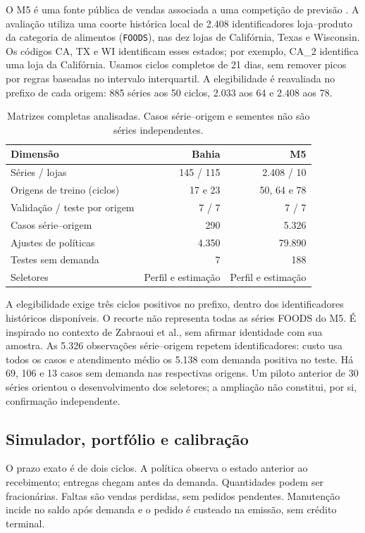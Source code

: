 \documentclass[preprint,12pt]{elsarticle}
\begin{document}
O M5 é uma fonte pública de vendas associada a uma competição de previsão \cite{Makridakis2022M5Accuracy}. A avaliação utiliza uma coorte histórica local de 2.408 identificadores loja--produto da categoria de alimentos (\texttt{FOODS}), nas dez lojas de Califórnia, Texas e Wisconsin. Os códigos CA, TX e WI identificam esses estados; por exemplo, CA\_2 identifica uma loja da Califórnia. Usamos ciclos completos de 21 dias, sem remover picos por regras baseadas no intervalo interquartil. A elegibilidade é reavaliada no prefixo de cada origem: 885 séries aos 50 ciclos, 2.033 aos 64 e 2.408 aos 78.

\begin{table}[htbp]\centering\small
\caption{Matrizes completas analisadas. Casos série--origem e sementes não são séries independentes.}\label{tab:datasets}
\begin{tabular}{@{}lrr@{}}\toprule
Dimensão & Bahia & M5\\\midrule
Séries / lojas & 145 / 115 & 2.408 / 10\\
Origens de treino (ciclos) & 17 e 23 & 50, 64 e 78\\
Validação / teste por origem & 7 / 7 & 7 / 7\\
Casos série--origem & 290 & 5.326\\
Ajustes de políticas & 4.350 & 79.890\\
Testes sem demanda & 7 & 188\\
Seletores & Perfil e estimação & Perfil e estimação\\\bottomrule
\end{tabular}\end{table}

A elegibilidade exige três ciclos positivos no prefixo, dentro dos identificadores históricos disponíveis. O recorte não representa todas as séries FOODS do M5. É inspirado no contexto de Zabraoui et al., sem afirmar identidade com sua amostra. As 5.326 observações série--origem repetem identificadores: custo usa todos os casos e atendimento médio os 5.138 com demanda positiva no teste. Há 69, 106 e 13 casos sem demanda nas respectivas origens. Um piloto anterior de 30 séries orientou o desenvolvimento dos seletores; a ampliação não constitui, por si, confirmação independente.

\subsection{Simulador, portfólio e calibração}
O prazo exato é de dois ciclos. A política observa o estado anterior ao recebimento; entregas chegam antes da demanda. Quantidades podem ser fracionárias. Faltas são vendas perdidas, sem pedidos pendentes. Manutenção incide no saldo após demanda e o pedido é custeado na emissão, sem crédito terminal.
\end{document}
